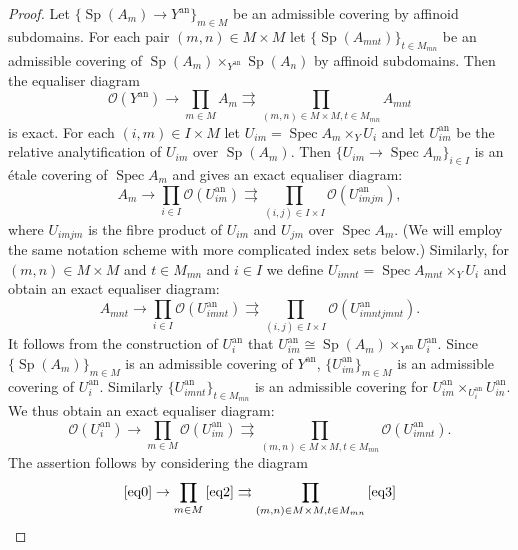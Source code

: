 \documentclass{amsart}
\theoremstyle{definition}
\theoremstyle{remark}
\DeclareMathOperator{\Spec}{Spec}
\DeclareMathOperator{\Sp}{Sp}
\newcommand{\OO}{\mathcal O}
\newcommand{\ana}{\mathrm{an}}
\begin{document}
\begin{proof} 
Let $\{\Sp(A_m)\rightarrow Y^{\ana}\}_{m\in M}$ be an admissible covering by affinoid subdomains. For each 
pair $(m,n)\in M\times M$ let 
 $\{\Sp(A_{mnt})\}_{t\in M_{mn}}$
be an admissible covering of $\Sp(A_m)\times_{Y^{\ana}} \Sp(A_n)$
by affinoid subdomains. Then the equaliser diagram 
\begin{equation}\label{eq1}
\OO(Y^{\ana})\rightarrow \prod_{m\in M} A_m \rightrightarrows \prod_{(m,n)\in M\times M, t\in M_{mn}} A_{mnt}
\end{equation}
is exact. For each $(i,m)\in I\times M$ let $U_{im}= \Spec A_m\times_{Y} U_i$ and let $U_{im}^{\ana}$ be the relative 
analytification of $U_{im}$ over $\Sp(A_m)$. Then 
 $\{U_{im}\rightarrow \Spec A_m \}_{i\in I}$ is an \'etale covering of $\Spec A_m$ and  gives an exact equaliser diagram: 
\begin{equation}\label{eq2}
A_{m}\rightarrow \prod_{i\in I} \OO(U_{im}^{\ana})\rightrightarrows \prod_{(i,j)\in I\times I} \OO(U_{imjm}^{\ana}),
\end{equation}
where $U_{imjm}$ is the fibre product of $U_{im}$ and $U_{jm}$ over $\Spec A_{m}$. (We will employ the same notation scheme with more complicated index sets below.) Similarly, for $(m, n)\in M\times M$ and $t\in M_{mn}$ and $i\in I$ we define $U_{imnt}=\Spec A_{mnt}\times_Y U_i$ and obtain an exact equaliser diagram: 
\begin{equation}\label{eq3}
A_{mnt}\rightarrow \prod_{i\in I} \OO(U_{imnt}^{\ana})\rightrightarrows \prod_{(i,j)\in I\times I} \OO(U_{imntjmnt}^{\ana}).
\end{equation}
It follows from the construction of $U_i^{\ana}$ that 
$U_{im}^{\ana}\cong \Sp(A_m)\times_{Y^{\ana}} U_i^{\ana}$. 
Since $\{\Sp(A_m)\}_{m\in M}$ is an admissible covering of $Y^{\ana}$, 
$\{U_{im}^{\ana}\}_{m\in M}$ is an admissible covering of $U_i^{\ana}$. Similarly $\{U_{imnt}^{\ana}\}_{t\in M_{mn}}$ is an admissible covering 
for $U_{im}^{\ana}\times_{U_i^{\ana}}U^{\ana}_{in}$. We thus obtain an exact equaliser diagram: 
\begin{equation}\label{eq4} 
\OO(U_i^{\ana})\rightarrow \prod_{m\in M} \OO(U_{im}^{\ana})\rightrightarrows
\prod_{(m,n)\in M\times M, t\in M_{mn}}\OO(U_{imnt}^{\ana}).
\end{equation}
The assertion follows by considering 
the diagram 
\begin{equation} 
\eqref{eq0}\rightarrow \prod_{m\in M} \eqref{eq2}\rightrightarrows \prod_{(m,n)\in M\times M, t\in M_{mn}} \eqref{eq3}

\end{equation}
\end{proof}
\end{document}
